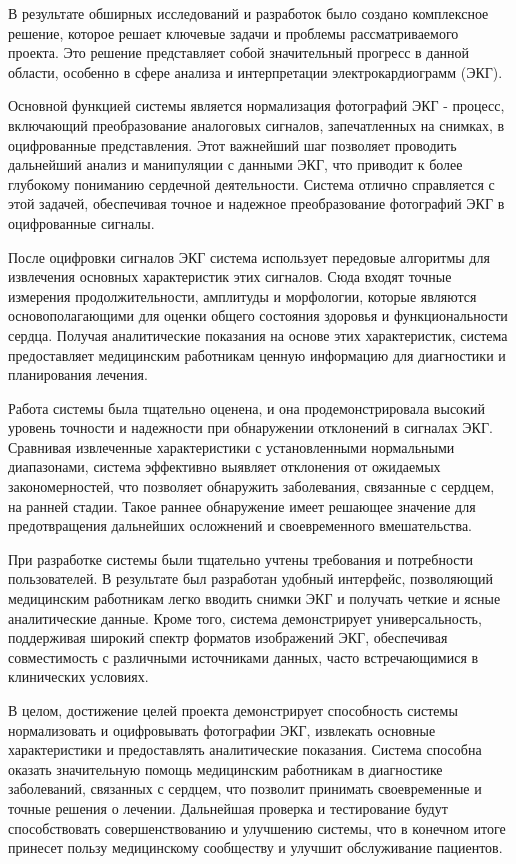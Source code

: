 \conclusion
В результате обширных исследований и разработок было создано комплексное решение, которое решает ключевые задачи и проблемы рассматриваемого проекта. Это решение представляет собой значительный прогресс в данной области, особенно в сфере анализа и интерпретации электрокардиограмм (ЭКГ).

Основной функцией системы является нормализация фотографий ЭКГ - процесс, включающий преобразование аналоговых сигналов, запечатленных на снимках, в оцифрованные представления. Этот важнейший шаг позволяет проводить дальнейший анализ и манипуляции с данными ЭКГ, что приводит к более глубокому пониманию сердечной деятельности. Система отлично справляется с этой задачей, обеспечивая точное и надежное преобразование фотографий ЭКГ в оцифрованные сигналы.

После оцифровки сигналов ЭКГ система использует передовые алгоритмы для извлечения основных характеристик этих сигналов. Сюда входят точные измерения продолжительности, амплитуды и морфологии, которые являются основополагающими для оценки общего состояния здоровья и функциональности сердца. Получая аналитические показания на основе этих характеристик, система предоставляет медицинским работникам ценную информацию для диагностики и планирования лечения.

Работа системы была тщательно оценена, и она продемонстрировала высокий уровень точности и надежности при обнаружении отклонений в сигналах ЭКГ. Сравнивая извлеченные характеристики с установленными нормальными диапазонами, система эффективно выявляет отклонения от ожидаемых закономерностей, что позволяет обнаружить заболевания, связанные с сердцем, на ранней стадии. Такое раннее обнаружение имеет решающее значение для предотвращения дальнейших осложнений и своевременного вмешательства.

При разработке системы были тщательно учтены требования и потребности пользователей. В результате был разработан удобный интерфейс, позволяющий медицинским работникам легко вводить снимки ЭКГ и получать четкие и ясные аналитические данные. Кроме того, система демонстрирует универсальность, поддерживая широкий спектр форматов изображений ЭКГ, обеспечивая совместимость с различными источниками данных, часто встречающимися в клинических условиях.

В целом, достижение целей проекта демонстрирует способность системы нормализовать и оцифровывать фотографии ЭКГ, извлекать основные характеристики и предоставлять аналитические показания. Система способна оказать значительную помощь медицинским работникам в диагностике заболеваний, связанных с сердцем, что позволит принимать своевременные и точные решения о лечении. Дальнейшая проверка и тестирование будут способствовать совершенствованию и улучшению системы, что в конечном итоге принесет пользу медицинскому сообществу и улучшит обслуживание пациентов.